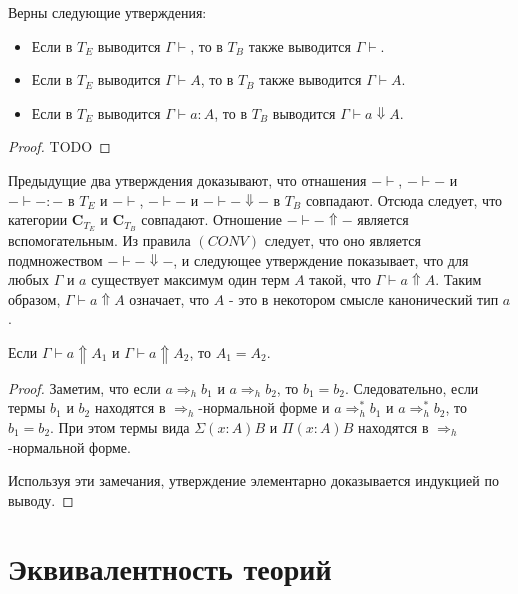 \documentclass{amsart}
\theoremstyle{definition}
\theoremstyle{remark}
\newcommand{\red}{\Rightarrow}
\newcommand{\cat}[1]{\mathbf{#1}}
\renewcommand{\C}{\cat{C}}
\numberwithin{figure}{section}
\begin{document}
\begin{prop}
Верны следующие утверждения:
\begin{itemize}
\item Если в $T_E$ выводится $\Gamma \vdash$, то в $T_B$ также выводится $\Gamma \vdash$.
\item Если в $T_E$ выводится $\Gamma \vdash A$, то в $T_B$ также выводится $\Gamma \vdash A$.
\item Если в $T_E$ выводится $\Gamma \vdash a : A$, то в $T_B$ выводится $\Gamma \vdash a \Downarrow A$.
\end{itemize}
\end{prop}
\begin{proof}
TODO
\end{proof}

Предыдущие два утверждения доказывают, что отнашения $- \vdash$, $- \vdash -$ и $- \vdash - : -$ в $T_E$ и $- \vdash$, $- \vdash -$ и $- \vdash - \Downarrow -$ в $T_B$ совпадают.
Отсюда следует, что категории $\C_{T_E}$ и $\C_{T_B}$ совпадают.
Отношение $- \vdash - \Uparrow -$ является вспомогательным.
Из правила $(CONV)$ следует, что оно является подмножеством $- \vdash - \Downarrow -$,
и следующее утверждение показывает, что для любых $\Gamma$ и $a$ существует максимум один терм $A$ такой, что $\Gamma \vdash a \Uparrow A$.
Таким образом, $\Gamma \vdash a \Uparrow A$ означает, что $A$ - это в некотором смысле канонический тип $a$.

\begin{prop}
Если $\Gamma \vdash a \Uparrow A_1$ и $\Gamma \vdash a \Uparrow A_2$, то $A_1 = A_2$.
\end{prop}
\begin{proof}
Заметим, что если $a \red_h b_1$ и $a \red_h b_2$, то $b_1 = b_2$.
Следовательно, если термы $b_1$ и $b_2$ находятся в $\red_h$-нормальной форме и $a \red^*_h b_1$ и $a \red^*_h b_2$, то $b_1 = b_2$.
При этом термы вида $\Sigma (x : A) B$ и $\Pi (x : A) B$ находятся в $\red_h$-нормальной форме.

Используя эти замечания, утверждение элементарно доказывается индукцией по выводу.
\end{proof}

\section{Эквивалентность теорий}
\end{document}
